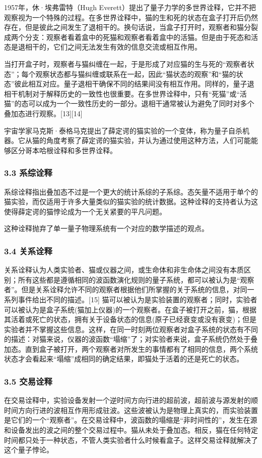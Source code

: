 1957年，休·埃弗雷特（Hugh Everett）提出了量子力学的多世界诠释，它并不把观察视为一个特殊的过程。在多世界诠释中，猫的生和死的状态在盒子打开后仍然存在，但是彼此之间发生了退相干的。换句话说，当盒子打开时，观察者和猫分裂成两个分支：观察者看着盒中的死猫和观察者看着盒中的活猫。但是由于死态和活态是退相干的，它们之间无法发生有效的信息交流或相互作用。

当打开盒子时，观察者与猫纠缠在一起，于是形成了对应猫的生与死的“观察者状态”；每个观察状态都与猫纠缠或联系在一起，因此“猫状态的观察”和“猫的状态”彼此相互对应。量子退相干确保不同的结果间没有相互作用。同样的，量子退相干机制对于解释历史的一致性也很重要。在多世界诠释中，只有“死猫”或“活猫”的态可以成为一个一致性历史的一部分。退相干通常被认为避免了同时对多个叠加态进行观察。[13][14]

宇宙学家马克斯·泰格马克提出了薛定谔的猫实验的一个变体，称为量子自杀机器。它从猫的角度考察了薛定谔的猫实验，并认为通过使用这种方法，人们可能能够区分哥本哈根诠释和多世界诠释。

\subsubsection{3.3 系综诠释}
系综诠释指出叠加态不过是一个更大的统计系综的子系综。态矢量不适用于单个的猫实验，而仅适用于许多大量类似的猫实验的统计数据。这种诠释的支持者认为这使得薛定谔的猫悖论成为一个无关紧要的平凡问题。

这种诠释抛弃了单一量子物理系统有一个对应的数学描述的观点。

\subsubsection{3.4 关系诠释}
关系诠释认为人类实验者、猫或仪器之间，或生命体和非生命体之间没有本质区别；所有这些都是遵循相同的波函数演化规则的量子系统，都可以被认为是“观察者”。但是关系诠释允许不同的观察者根据他们所掌握的关于系统的信息，对同一系列事件给出不同的描述。[15] 猫可以被认为是实验装置的观察者；同时，实验者可以被认为是盒子系统(猫加上仪器)的一个观察者。在盒子被打开之前，猫，根据其活着或死亡的状态，拥有关于设备状态的信息(原子已经衰变或没有衰变)；但是实验者并不掌握这些信息。这样，在同一时刻两位观察者对盒子系统的状态有不同的描述：对猫来说，仪器的波函数“塌缩”了；对实验者来说，盒子系统仍然处于叠加态。直到盒子被打开，两个观察者对所发生的事情都有了相同的信息，两个系统状态才会看起来“塌缩”成相同的确定结果，即猫处于活着的还是死亡的状态。

\subsubsection{3.5 交易诠释}
在交易诠释中，实验设备发射一个逆时间方向行进的超前波，超前波与源发射的顺时间方向行进的波相互作用形成驻波。这些波被认为是物理上真实的，而实验装置是它们的一个“观察者”。在交易诠释中，波函数的塌缩是“非时间性的”，发生在源和设备发出的波之间的整个交易过程中。猫从未处于叠加态。相反，猫在任何特定时间都只处于一种状态，不管人类实验者什么时候看盒子。这样交易诠释就解决了这个量子悖论。

